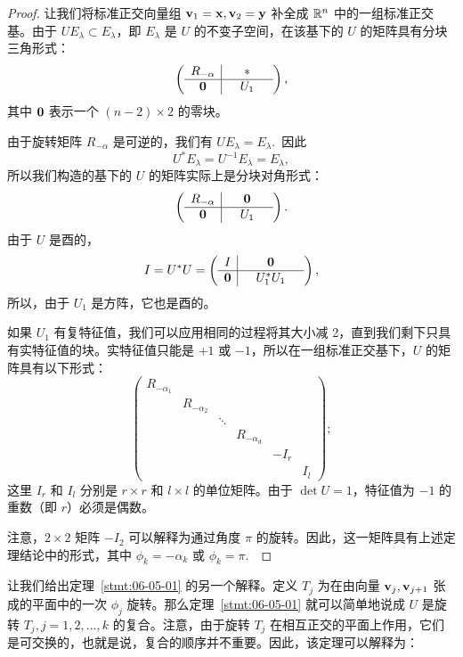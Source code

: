 \begin{proof}
让我们将标准正交向量组 $\mathbf{v}_1 = \mathbf{x}, \mathbf{v}_2 = \mathbf{y}$ 补全成 $\mathbb{R}^n$ 中的一组标准正交基。由于 $UE_\lambda \subset E_\lambda$，即 $E_\lambda$ 是 $U$ 的不变子空间，在该基下的 $U$ 的矩阵具有分块三角形式：
$$
\left(\begin{array}{c|ccc} R_{-\alpha} & & * & \\ \hline  \mathbf{0} & & U_1  &
\end{array}\right),
$$
其中 $\mathbf{0}$ 表示一个 $(n-2) \times 2$ 的零块。

由于旋转矩阵 $R_{-\alpha}$ 是可逆的，我们有 $U E_\lambda = E_\lambda$.~因此
$$
U^* E_\lambda = U^{-1} E_\lambda = E_\lambda,
$$
所以我们构造的基下的 $U$ 的矩阵实际上是分块对角形式：
$$
\left(\begin{array}{c|ccc} R_{-\alpha} & & \mathbf{0} \\ \hline \mathbf{0} & & U_1 & \end{array}\right).
$$
由于 $U$ 是酉的，
$$
I = U^*U = \left(\begin{array}{c|ccc} I & & \mathbf{0} & \\ \hline \mathbf{0} & & U_1^* U_1 & \end{array}\right),
$$
所以，由于 $U_1$ 是方阵，它也是酉的。

如果 $U_1$ 有复特征值，我们可以应用相同的过程将其大小减 2，直到我们剩下只具有实特征值的块。实特征值只能是 $+1$ 或 $-1$，所以在一组标准正交基下，$U$ 的矩阵具有以下形式：
$$\begin{pmatrix} R_{-\alpha_1} & & & & & \\ & R_{-\alpha_2} & & & & \\ & & \ddots & & & \\ & & & R_{-\alpha_d} & & \\ & & & & -I_r & \\ & & & & & I_l \end{pmatrix};$$
这里 $I_r$ 和 $I_l$ 分别是 $r \times r$ 和 $l \times l$ 的单位矩阵。由于 $\det U = 1$，特征值为 $-1$ 的重数（即 $r$）必须是偶数。

注意，$2 \times 2$ 矩阵 $-I_2$ 可以解释为通过角度 $\pi$ 的旋转。因此，这一矩阵具有上述定理结论中的形式，其中 $\phi_k = -\alpha_k$ 或 $\phi_k = \pi$.~\end{proof}

让我们给出定理~\ref{stmt:06-05-01} 的另一个解释。定义 $T_j$ 为在由向量 $\mathbf{v}_j, \mathbf{v}_{j+1}$ 张成的平面中的一次 $\phi_j$ 旋转。那么定理~\ref{stmt:06-05-01} 就可以简单地说成 $U$ 是旋转 $T_j, j = 1, 2, \dots, k$ 的复合。注意，由于旋转 $T_j$ 在相互正交的平面上作用，它们是可交换的，也就是说，复合的顺序并不重要。因此，该定理可以解释为：

